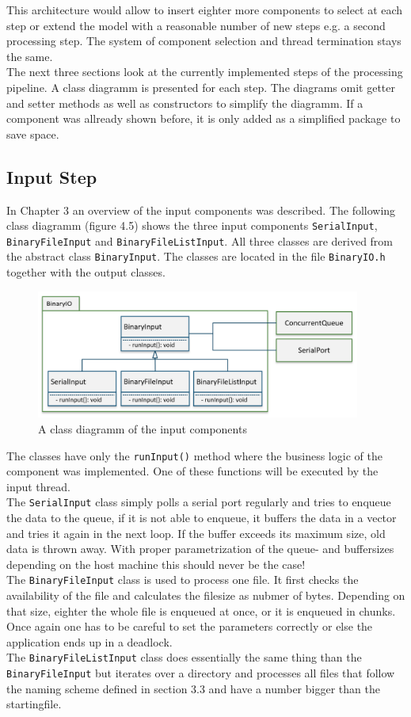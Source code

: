 This architecture would allow to insert eighter more components to select at each step or extend the model with a reasonable number of new steps e.g. a second processing step. The system of component selection and thread termination stays the same.\\
The next three sections look at the currently implemented steps of the processing pipeline. A class diagramm is presented for each step. The diagrams omit getter and setter methods as well as constructors to simplify the diagramm. If a component was allready shown before, it is only added as a simplified package to save space.
\subsection{Input Step}
In Chapter 3 an overview of the input components was described. The following class diagramm (figure 4.5) shows the three input components \texttt{SerialInput}, \texttt{BinaryFileInput} and \texttt{BinaryFileListInput}. All three classes are derived from the abstract class \texttt{BinaryInput}. The classes are located in the file \texttt{BinaryIO.h} together with the output classes.

\begin{figure}[h]
\centering
      \includegraphics[width=0.95\textwidth]{input}
        \caption{A class diagramm of the input components}
\end{figure}

The classes have only the \texttt{runInput()} method where the business logic of the component was implemented. One of these functions will be executed by the input thread. \\ The \texttt{SerialInput} class simply polls a serial port regularly and tries to enqueue the data to the queue, if it is not able to enqueue, it buffers the data in a vector and tries it again in the next loop. If the buffer exceeds its maximum size, old data is thrown away. With proper parametrization of the queue- and buffersizes depending on the host machine this should never be the case!\\
The \texttt{BinaryFileInput} class is used to process one file. It first checks the availability of the file and calculates the filesize as nubmer of bytes. Depending on that size, eighter the whole file is enqueued at once, or it is enqueued in chunks. Once again one has to be careful to set the parameters correctly or else the application ends up  in a deadlock.\\
The \texttt{BinaryFileListInput} class does essentially the same thing than the \texttt{BinaryFileInput} but iterates over a directory and processes all files that follow the naming scheme defined in section 3.3 and have a number bigger than the startingfile.
